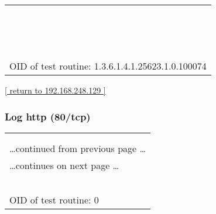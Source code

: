 \documentclass{article}
\begin{document}
\begin{longtable}{|p{}|}
\rowcolor{white}{\verb=     the two hosts where Telnet is being used can intercept the packets passing =}\\
\rowcolor{white}{$\hookrightarrow$\verb=by=}\\
\rowcolor{white}{\verb=     and obtain login and password information (and whatever else is typed) with=}\\
\rowcolor{white}{$\hookrightarrow$\verb= any=}\\
\rowcolor{white}{\verb=     of several common utilities like tcpdump and Wireshark.=}\\
\rowcolor{white}{\verb=    =}\\
\rowcolor{white}{\verb=   * Most implementations of Telnet have no authentication that would ensure=}\\
\rowcolor{white}{\verb=     communication is carried out between the two desired hosts and not intercep=}\\
\rowcolor{white}{$\hookrightarrow$\verb=ted=}\\
\rowcolor{white}{\verb=     in the middle.=}\\
\rowcolor{white}{\verb=   * Commonly used Telnet daemons have several vulnerabilities discovered over=}\\
\rowcolor{white}{\verb=     the years.=}\\
\rowcolor{white}{\verb==}\\
\rowcolor{white}{\verb==}\\
\\
OID of test routine: 1.3.6.1.4.1.25623.1.0.100074\\
\end{longtable}

\begin{footnotesize}\hyperref[host:192.168.248.129]{[ return to 192.168.248.129 ]}\end{footnotesize}
\subsubsection{Log http (80/tcp)}
\label{port:192.168.248.129 http (80/tcp) Log}

\begin{longtable}{|p{}|}
\hline
\rowcolor{openvas_log}{\color{white}{Log}}\\
\rowcolor{openvas_log}{\color{white}{NVT: }}\\
\hline
\endfirsthead
\hfill\ldots continued from previous page \ldots \\
\hline
\endhead
\hline
\ldots continues on next page \ldots \\
\endfoot
\hline
\endlastfoot
\\
\rowcolor{white}{\verb=Open port.=}\\
\rowcolor{white}{\verb==}\\
\rowcolor{white}{\verb==}\\
\\
OID of test routine: 0\\
\end{longtable}
\end{document}
